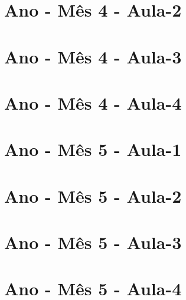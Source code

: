 \begin{multicols}{2}
	
\section[\sffamily 4\textordmasculine\space Ano - M\^{e}s 4 - Aula-2]{\textordmasculine\space Ano - M\^{e}s 4 - Aula-2}


\section[\sffamily 4\textordmasculine\space Ano - M\^{e}s 4 - Aula-3]{\textordmasculine\space Ano - M\^{e}s 4 - Aula-3}


\section[\sffamily 4\textordmasculine\space Ano - M\^{e}s 4 - Aula-4]{\textordmasculine\space Ano - M\^{e}s 4 - Aula-4}


\section[\sffamily 4\textordmasculine\space Ano - M\^{e}s 5 - Aula-1]{\textordmasculine\space Ano - M\^{e}s 5 - Aula-1}


\section[\sffamily 4\textordmasculine\space Ano - M\^{e}s 5 - Aula-2]{\textordmasculine\space Ano - M\^{e}s 5 - Aula-2}


\section[\sffamily 4\textordmasculine\space Ano - M\^{e}s 5 - Aula-3]{\textordmasculine\space Ano - M\^{e}s 5 - Aula-3}


\section[\sffamily 4\textordmasculine\space Ano - M\^{e}s 5 - Aula-4]{\textordmasculine\space Ano - M\^{e}s 5 - Aula-4}



\end{multicols}
